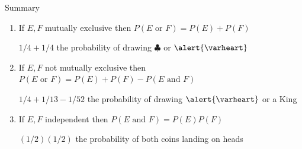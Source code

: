 \documentclass{beamer}
\theoremstyle{definition}
\begin{document}
\begin{frame}{Summary}
\begin{enumerate}
\item If $E,F$ mutually exclusive then
$P\left(\text{$E$ or $F$}\right)=P\left(E\right)+P\left(F\right)$
\begin{example} $1/4+1/4$ the probability
of drawing $\clubsuit$ or $\alert{\varheart}$ \end{example}
\item If $E,F$ \alert{not} mutually exclusive then
$P\left(\text{$E$ or $F$}\right)=P\left(E\right)+P\left(F\right)
-P\left(\text{$E$ and $F$}\right)$
\begin{example} $1/4+1/13-1/52$ the probability
of drawing $\alert{\varheart}$ or a King\end{example}
\item If $E,F$ independent then
$P\left(\text{$E$ and $F$}\right)=P\left(E\right)P\left(F\right)$
\begin{example} $\left(1/2\right)\left(1/2\right)$ the probability
of both coins landing on heads\end{example}
\end{enumerate}
\end{frame}

\end{document}
